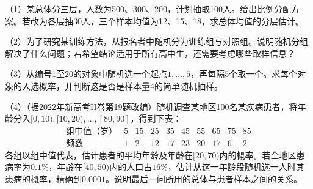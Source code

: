 \begin{exercise}
\mbox{}\par\nobreak

（1）某总体分三层，人数为500、300、200，计划抽取100人。给出比例分配方案。若改为各层抽30人，三个样本均值为12、15、18，求总体均值的分层估计。

（2）为了研究某训练方法，从报名者中随机分为训练组与对照组。说明随机分组解决了什么问题；若希望结论适用于所有高中生，还需要考虑哪些取样信息？

（3）从编号1至20的对象中随机选一个起点\(1,\ldots,5\)，再每隔5个取一个。求每个对象的入选概率，并判断这是否是样本量4的简单随机抽样。

（4）（据2022年新高考II卷第19题改编）随机调查某地区100名某疾病患者，将年龄分入\([0,10),[10,20),\ldots,[80,90]\)，得到下表：
\[
\begin{array}{c|rrrrrrrrr}
 \text{组中值（岁）}&5&15&25&35&45&55&65&75&85\\\hline
 \text{频数}&1&2&12&17&23&20&17&6&2
\end{array}
\]
各组以组中值代表，估计患者的平均年龄及年龄在\([20,70)\)内的概率。若全地区患病率为\(0.1\%\)，年龄在\([40,50)\)内的人口占\(16\%\)，估计从这一年龄段随机选一人时其患病的概率，精确到\(0.0001\)。说明最后一问所用的总体与患者样本之间的关系。
\end{exercise}
